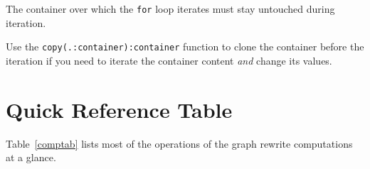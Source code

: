 \begin{warning}
The container over which the \texttt{for} loop iterates must stay untouched during iteration.

Use the \texttt{copy(.:container):container} function to clone the container before the iteration if you need to iterate the container content \emph{and} change its values.
\end{warning}



\section{Quick Reference Table}

Table~\ref{comptab} lists most of the operations of the graph rewrite computations at a glance.


